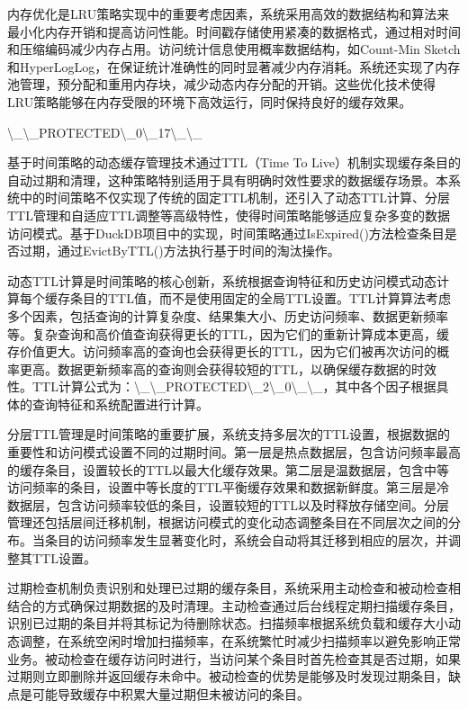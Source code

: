 内存优化是LRU策略实现中的重要考虑因素，系统采用高效的数据结构和算法来最小化内存开销和提高访问性能。时间戳存储使用紧凑的数据格式，通过相对时间和压缩编码减少内存占用。访问统计信息使用概率数据结构，如Count-Min Sketch和HyperLogLog，在保证统计准确性的同时显著减少内存消耗。系统还实现了内存池管理，预分配和重用内存块，减少动态内存分配的开销。这些优化技术使得LRU策略能够在内存受限的环境下高效运行，同时保持良好的缓存效果。

\textbackslash{}_\textbackslash{}_PROTECTED\textbackslash{}_0\textbackslash{}_17\textbackslash{}_\textbackslash{}_

基于时间策略的动态缓存管理技术通过TTL（Time To Live）机制实现缓存条目的自动过期和清理，这种策略特别适用于具有明确时效性要求的数据缓存场景。本系统中的时间策略不仅实现了传统的固定TTL机制，还引入了动态TTL计算、分层TTL管理和自适应TTL调整等高级特性，使得时间策略能够适应复杂多变的数据访问模式。基于DuckDB项目中的实现，时间策略通过IsExpired()方法检查条目是否过期，通过EvictByTTL()方法执行基于时间的淘汰操作。

动态TTL计算是时间策略的核心创新，系统根据查询特征和历史访问模式动态计算每个缓存条目的TTL值，而不是使用固定的全局TTL设置。TTL计算算法考虑多个因素，包括查询的计算复杂度、结果集大小、历史访问频率、数据更新频率等。复杂查询和高价值查询获得更长的TTL，因为它们的重新计算成本更高，缓存价值更大。访问频率高的查询也会获得更长的TTL，因为它们被再次访问的概率更高。数据更新频率高的查询则会获得较短的TTL，以确保缓存数据的时效性。TTL计算公式为：\textbackslash{}_\textbackslash{}_PROTECTED\textbackslash{}_2\textbackslash{}_0\textbackslash{}_\textbackslash{}_，其中各个因子根据具体的查询特征和系统配置进行计算。

分层TTL管理是时间策略的重要扩展，系统支持多层次的TTL设置，根据数据的重要性和访问模式设置不同的过期时间。第一层是热点数据层，包含访问频率最高的缓存条目，设置较长的TTL以最大化缓存效果。第二层是温数据层，包含中等访问频率的条目，设置中等长度的TTL平衡缓存效果和数据新鲜度。第三层是冷数据层，包含访问频率较低的条目，设置较短的TTL以及时释放存储空间。分层管理还包括层间迁移机制，根据访问模式的变化动态调整条目在不同层次之间的分布。当条目的访问频率发生显著变化时，系统会自动将其迁移到相应的层次，并调整其TTL设置。

过期检查机制负责识别和处理已过期的缓存条目，系统采用主动检查和被动检查相结合的方式确保过期数据的及时清理。主动检查通过后台线程定期扫描缓存条目，识别已过期的条目并将其标记为待删除状态。扫描频率根据系统负载和缓存大小动态调整，在系统空闲时增加扫描频率，在系统繁忙时减少扫描频率以避免影响正常业务。被动检查在缓存访问时进行，当访问某个条目时首先检查其是否过期，如果过期则立即删除并返回缓存未命中。被动检查的优势是能够及时发现过期条目，缺点是可能导致缓存中积累大量过期但未被访问的条目。

